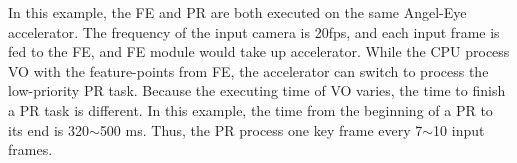 In this example, the FE and PR are both executed on the same Angel-Eye accelerator. The frequency of the input camera is 20fps, and each input frame is fed to the FE, and FE module would take up accelerator. While the CPU process VO with the feature-points from FE, the accelerator can switch to process the low-priority PR task. Because the executing time of VO varies, the time to finish a PR task is different. In this example, the time from the beginning of a PR to its end is 320$\sim$500 ms. Thus, the PR process one key frame every 7$\sim$10 input frames.